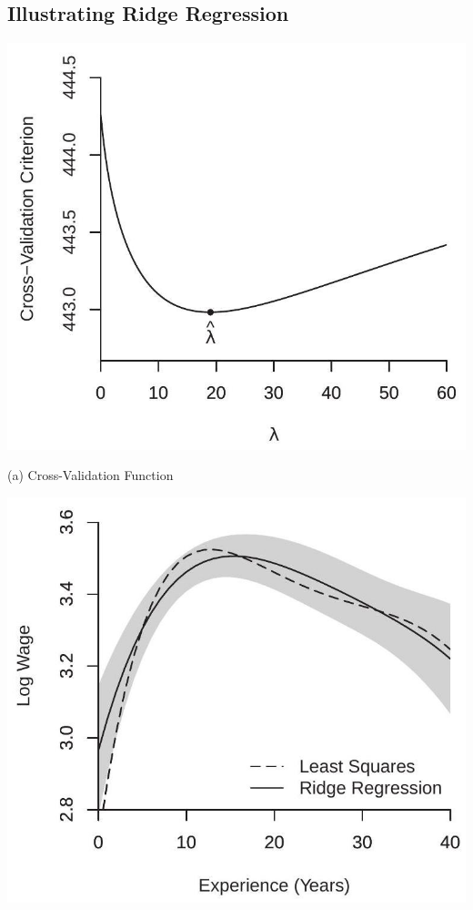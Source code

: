 \documentclass[10pt]{article}
\begin{document}
\subsection{Illustrating Ridge Regression}
\begin{center}
\includegraphics[max width=\textwidth]{2022_11_27_70699ac9776c9435969dg-08}
\end{center}

(a) Cross-Validation Function

\begin{center}
\includegraphics[max width=\textwidth]{2022_11_27_70699ac9776c9435969dg-08(1)}
\end{center}
\end{document}
